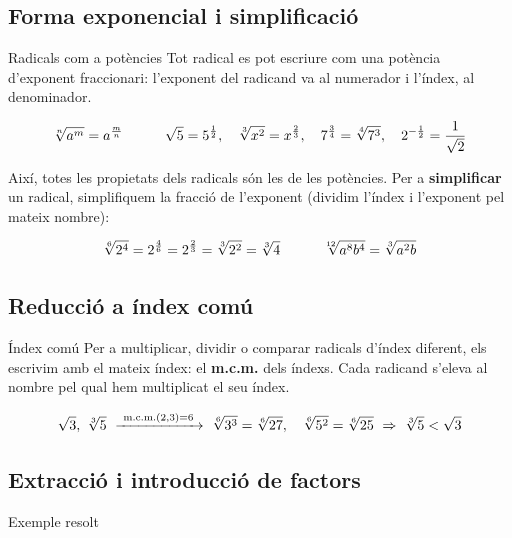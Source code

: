 \documentclass[11pt,a4paper]{article}
\makeatletter
\newcommand{\lt}{<}\newcommand{\gt}{>}
\newcommand{\fmm}[1]{\setbox0=\hbox{$#1$}\ifdim\wd0>0.8\linewidth\def\fmmnext{\fmmdisp{#1}}\else\def\fmmnext{\mbox{\box0}}\fi\fmmnext}
\def\fmmdisp#1{\@ifnextchar.{\fmmdispp{#1}}{\@ifnextchar,{\fmmdispc{#1}}{\@ifnextchar;{\fmmdisps{#1}}{\fmdisp{#1}}}}}
\def\fmmdispp#1.{\fmdisp{#1\,.}}\def\fmmdispc#1,{\fmdisp{#1\,,}}\def\fmmdisps#1;{\fmdisp{#1\,;}}
\newcommand{\fmdisp}[1]{\[\setbox2=\hbox{$\displaystyle #1$}\ifdim\wd2>\linewidth\resizebox{\linewidth}{!}{\box2}\else\box2\fi\]}
\makeatother
\begin{document}
\Needspace{5.1cm}
\subsection*{Forma exponencial i simplificació}
\begin{fmdef}{Radicals com a potències}
Tot radical es pot escriure com una potència d'exponent fraccionari: l'exponent del radicand va al numerador i l'índex, al denominador.

\fmdisp{\sqrt[n]{a^m}=a^{\frac mn}\qquad\quad \sqrt5=5^{\frac12},\quad \sqrt[3]{x^2}=x^{\frac23},\quad 7^{\frac34}=\sqrt[4]{7^3},\quad 2^{-\frac12}=\dfrac{1}{\sqrt2}}

Així, totes les propietats dels radicals són les de les potències. Per a \textbf{simplificar} un radical, simplifiquem la fracció de l'exponent (dividim l'índex i l'exponent pel mateix nombre):

\fmdisp{\sqrt[6]{2^4}=2^{\frac46}=2^{\frac23}=\sqrt[3]{2^2}=\sqrt[3]4\qquad\quad \sqrt[12]{a^8b^4}=\sqrt[3]{a^2b}}

\end{fmdef}

\Needspace{5.1cm}
\subsection*{Reducció a índex comú}
\begin{fmdef}{Índex comú}
Per a multiplicar, dividir o comparar radicals d'índex diferent, els escrivim amb el mateix índex: el \textbf{m.c.m.} dels índexs. Cada radicand s'eleva al nombre pel qual hem multiplicat el seu índex.

\fmdisp{\sqrt{3},\ \sqrt[3]{5}\ \xrightarrow{\ \text{m.c.m.}(2,3)=6\ }\ \sqrt[6]{3^3}=\sqrt[6]{27},\quad \sqrt[6]{5^2}=\sqrt[6]{25}\ \Rightarrow\ \sqrt[3]5\lt\sqrt3}

\end{fmdef}

\Needspace{5.1cm}
\subsection*{Extracció i introducció de factors}
\begin{fmex}{Exemple resolt}
\end{fmex}
\end{document}
